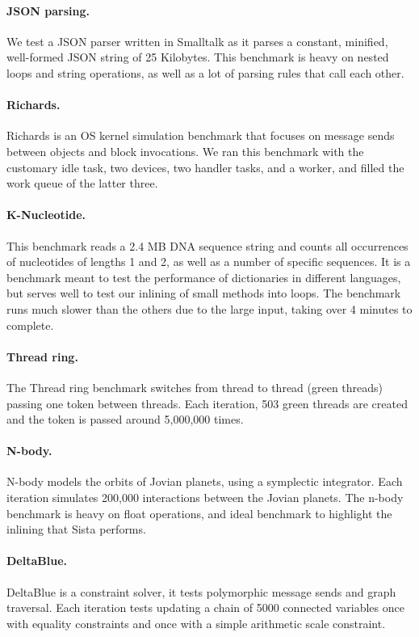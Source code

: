 \documentclass[a4paper,12pt,twoside]{../includes/ThesisStyle}
\begin{document}
	\paragraph{JSON parsing.}We test a JSON parser written in Smalltalk as it parses a constant, minified, well-formed JSON string of 25 Kilobytes. This benchmark is heavy on nested loops and string operations, as well as a lot of parsing rules that call each other.

	\paragraph{Richards.}Richards is an OS kernel simulation benchmark that focuses on message sends between objects and block invocations. We ran this benchmark with the customary idle task, two devices, two handler tasks, and a worker, and filled the work queue of the latter three.

	\paragraph{K-Nucleotide.}This benchmark reads a 2.4 MB DNA sequence string and counts all occurrences of nucleotides of lengths 1 and 2, as well as a number of specific sequences. It is a benchmark meant to test the performance of dictionaries in different languages, but serves well to test our inlining of small methods into loops. The benchmark runs much slower than the others due to the large input, taking over 4 minutes to complete.

	\paragraph{Thread ring.}The Thread ring benchmark switches from thread to thread (green threads) passing one token between threads. Each iteration, 503 green threads are created and the token is passed around 5,000,000 times.

	\paragraph{N-body.}N-body models the orbits of Jovian planets, using a symplectic integrator. Each iteration simulates 200,000 interactions between the Jovian planets. The n-body benchmark is heavy on float operations, and ideal benchmark to highlight the inlining that Sista performs.

	\paragraph{DeltaBlue.}DeltaBlue is a constraint solver, it tests polymorphic message sends and graph traversal. Each iteration tests updating a chain of 5000 connected variables once with equality constraints and once with a simple arithmetic scale constraint.
\end{document}
